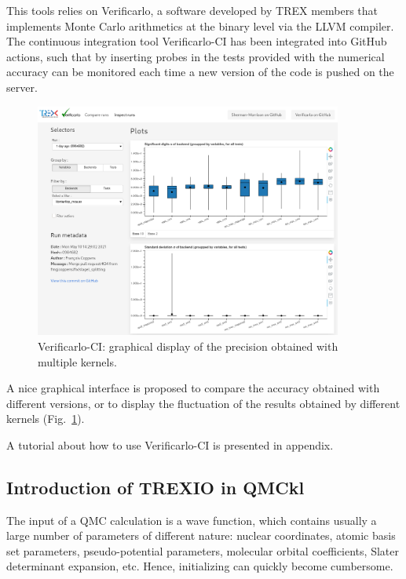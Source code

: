This tools relies on Verificarlo,\cite{verificarlo} a software
developed by TREX members that implements Monte Carlo arithmetics at
the binary level via the LLVM compiler. The continuous integration
tool Verificarlo-CI has been integrated into GitHub actions, such that
by inserting probes in the tests provided with \QMCkl{} the numerical
accuracy can be monitored each time a new version of the code is
pushed on the server.

\begin{figure}
\centering
  \includegraphics[width=0.9\textwidth]{images/inspect_runs.png}
  \caption{Verificarlo-CI: graphical display of the precision obtained
    with multiple kernels.}
    \label{fig:vfci}
\end{figure}
A nice graphical interface is proposed to compare the accuracy
obtained with different versions, or to display the fluctuation of
the results obtained by different kernels (Fig.~\ref{fig:vfci}).

A tutorial about how to use Verificarlo-CI is presented in appendix.

\subsection{Introduction of TREXIO in QMCkl}

The input of a \ac{QMC} calculation is a wave function, which
contains usually a large number of parameters of different nature:
nuclear coordinates, atomic basis set parameters, pseudo-potential
parameters, molecular orbital coefficients, Slater determinant
expansion, etc.
Hence, initializing \QMCkl{} can quickly become cumbersome.

